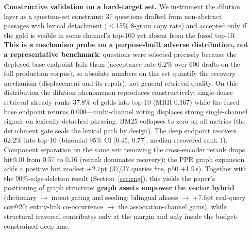 \documentclass[sigconf,nonacm]{acmart}
\begin{document}
\textbf{Constructive validation on a hard-target set.} We instrument the
dilution layer as a question-set constraint: 37 questions drafted from
non-abstract passages with lexical detachment ($\leq$15\% 8-gram copy rate)
and accepted only if the gold is visible in some channel's top-100 yet
absent from the fused top-10. \textbf{This is a mechanism probe on a
purpose-built adverse distribution, not a representative benchmark}:
questions were selected precisely because the deployed base endpoint fails
them (acceptance rate 6.2\% over 600 drafts on the full production corpus),
so absolute numbers on this set quantify the recovery mechanism
(displacement and its repair), not general retrieval quality.
On this distribution the dilution phenomenon reproduces constructively:
single-dense retrieval already ranks 37.8\% of golds into top-10 (MRR 0.167)
while the fused base endpoint returns 0.000---multi-channel voting displaces
strong single-channel signals on lexically-detached phrasing. BM25 collapses
to zero on all metrics (the detachment gate seals the lexical path by
design). The deep endpoint recovers 62.2\% into top-10 (binomial 95\% CI
[0.45, 0.77], median recovered rank 1). Component separation on the same
set: removing the cross-encoder rerank drops hit@10 from 0.57 to 0.16
(rerank dominates recovery); the PPR graph expansion adds a positive but
modest +2.7pt (37/37 queries fire, p50 +1.9\,s). Together with the
90\%-edge-deletion result (Section~\ref{sec:eng}), this yields the paper's
positioning of graph structure: \textbf{graph assets empower the vector
hybrid} (dictionary $\to$ intent gating and seeding; bilingual aliases $\to$
+7.6pt real-query cov@20; entity-link co-occurrence $\to$ the
association-channel gains), while structural traversal contributes only at
the margin and only inside the budget-constrained deep lane.
\end{document}
